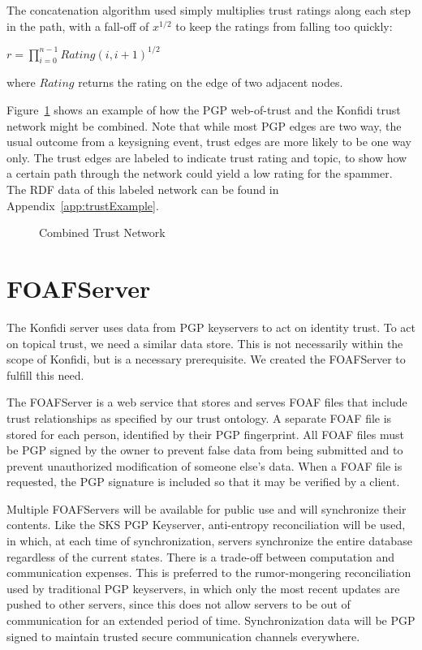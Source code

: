 \documentclass{acm_proc_article-sp}
\begin{document}
The concatenation algorithm used simply multiplies trust ratings along each step in the path, with a fall-off of $x^{1/2}$ to keep the ratings from falling too quickly:

\begin{center}
$r = \prod_{i=0}^{n-1} Rating(i, i + 1)^{1/2}$
\end{center}

where $Rating$ returns the rating on the edge of two adjacent nodes.

Figure~\ref{fig:full} shows an example of how the PGP web-of-trust and the Konfidi trust network might be combined.  Note that while most PGP edges are two way, the usual outcome from a keysigning event, trust edges are more likely to be one way only.  The trust edges are labeled to indicate trust rating and topic, to show how a certain path through the network could yield a low rating for the spammer.  The RDF data of this labeled network can be found in Appendix~\ref{app:trustExample}.

\begin{figure}[thp]
\centering
{}
\caption{Combined Trust Network}
\label{fig:full}
\end{figure}

\section{FOAFServer}
\label{foafserver}
The Konfidi server uses data from PGP keyservers to act on identity trust.  To act on topical trust, we need a similar data store.  This is not necessarily within the scope of Konfidi, but is a necessary prerequisite.  We created the FOAFServer to fulfill this need.

The FOAFServer is a web service that stores and serves FOAF files that include trust relationships as specified by our trust ontology.  A separate FOAF file is stored for each person, identified by their PGP fingerprint.  All FOAF files must be PGP signed by the owner to prevent false data from being submitted and to prevent unauthorized modification of someone else's data.  When a FOAF file is requested, the PGP signature is included so that it may be verified by a client.

Multiple FOAFServers will be available for public use and will synchronize their contents.  Like the SKS PGP Keyserver\citep{sks}, anti-entropy reconciliation will be used, in which, at each time of synchronization, servers synchronize the entire database regardless of the current states.  There is a trade-off between computation and communication expenses.  This is preferred to the rumor-mongering reconciliation  used by traditional PGP keyservers, in which only the most recent updates are pushed to other servers, since this does not allow servers to be out of communication for an extended period of time.  Synchronization data will be PGP signed to maintain trusted secure communication channels everywhere.
\end{document}
